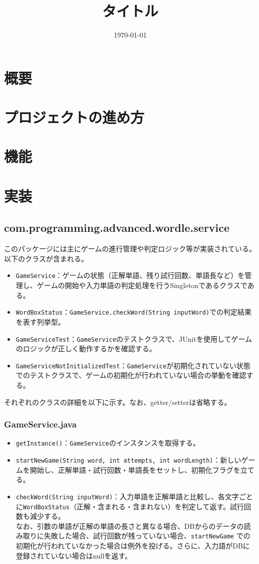 \documentclass[a4j]{ujarticle}
\title{タイトル}
\date{\today}
\author{}
\begin{document}
\maketitle
\section{概要}
\section{プロジェクトの進め方}
\section{機能}
\section{実装}
\subsection{com.programming.advanced.wordle.service}
このパッケージには主にゲームの進行管理や判定ロジック等が実装されている。以下のクラスが含まれる。
\begin{itemize}
  \item \texttt{GameService}：ゲームの状態（正解単語、残り試行回数、単語長など）を管理し、ゲームの開始や入力単語の判定処理を行うSingletonであるクラスである。
  \item \texttt{WordBoxStatus}：\texttt{GameService.checkWord(String inputWord)}での判定結果を表す列挙型。
  \item \texttt{GameServiceTest}：\texttt{GameService}のテストクラスで、JUnitを使用してゲームのロジックが正しく動作するかを確認する。
  \item \texttt{GameServiceNotInitializedTest}：\texttt{GameService}が初期化されていない状態でのテストクラスで、ゲームの初期化が行われていない場合の挙動を確認する。
\end{itemize}

それぞれのクラスの詳細を以下に示す。なお、getter/setterは省略する。
\subsubsection{GameService.java}

\begin{itemize}
  \item \texttt{getInstance()}：\texttt{GameService}のインスタンスを取得する。
  \item \texttt{startNewGame(String word, int attempts, int wordLength)}：新しいゲームを開始し、正解単語・試行回数・単語長をセットし、初期化フラグを立てる。
  \item \texttt{checkWord(String inputWord)}：入力単語を正解単語と比較し、各文字ごとに\texttt{WordBoxStatus}（正解・含まれる・含まれない）を判定して返す。試行回数も減少する。\\
  なお、引数の単語が正解の単語の長さと異なる場合、DBからのデータの読み取りに失敗した場合、試行回数が残っていない場合、\texttt{startNewGame} での初期化が行われていなかった場合は例外を投げる。さらに、入力語がDBに登録されていない場合はnullを返す。
\end{itemize}
\end{document}

